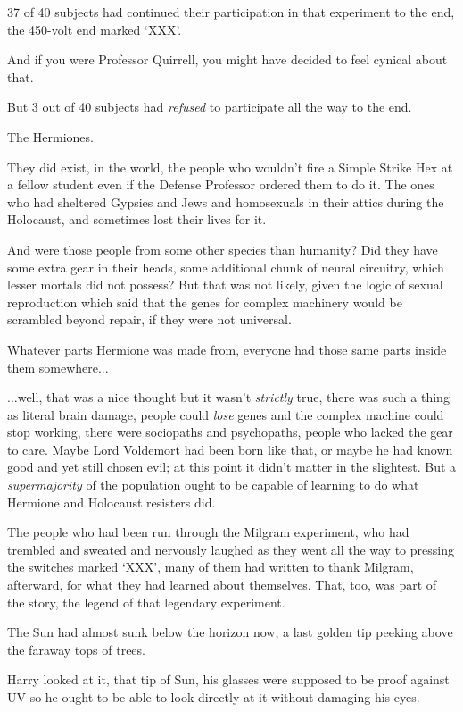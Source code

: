 37 of 40 subjects had continued their participation in that experiment
to the end, the 450-volt end marked `XXX'.

And if you were Professor Quirrell, you might have decided to feel
cynical about that.

But 3 out of 40 subjects had \emph{refused} to participate all the way
to the end.

The Hermiones.

They did exist, in the world, the people who wouldn't fire a Simple
Strike Hex at a fellow student even if the Defense Professor ordered
them to do it. The ones who had sheltered Gypsies and Jews and
homosexuals in their attics during the Holocaust, and sometimes lost
their lives for it.

And were those people from some other species than humanity? Did they
have some extra gear in their heads, some additional chunk of neural
circuitry, which lesser mortals did not possess? But that was not
likely, given the logic of sexual reproduction which said that the genes
for complex machinery would be scrambled beyond repair, if they were not
universal.

Whatever parts Hermione was made from, everyone had those same parts
inside them somewhere...

...well, that was a nice thought but it wasn't \emph{strictly}
true, there was such a thing as literal brain damage, people could
\emph{lose} genes and the complex machine could stop working, there were
sociopaths and psychopaths, people who lacked the gear to care. Maybe
Lord Voldemort had been born like that, or maybe he had known good and
yet still chosen evil; at this point it didn't matter in the slightest.
But a \emph{supermajority} of the population ought to be capable of
learning to do what Hermione and Holocaust resisters did.

The people who had been run through the Milgram experiment, who had
trembled and sweated and nervously laughed as they went all the way to
pressing the switches marked `XXX', many of them had written to thank
Milgram, afterward, for what they had learned about themselves. That,
too, was part of the story, the legend of that legendary experiment.

The Sun had almost sunk below the horizon now, a last golden tip peeking
above the faraway tops of trees.

Harry looked at it, that tip of Sun, his glasses were supposed to be
proof against UV so he ought to be able to look directly at it without
damaging his eyes.

